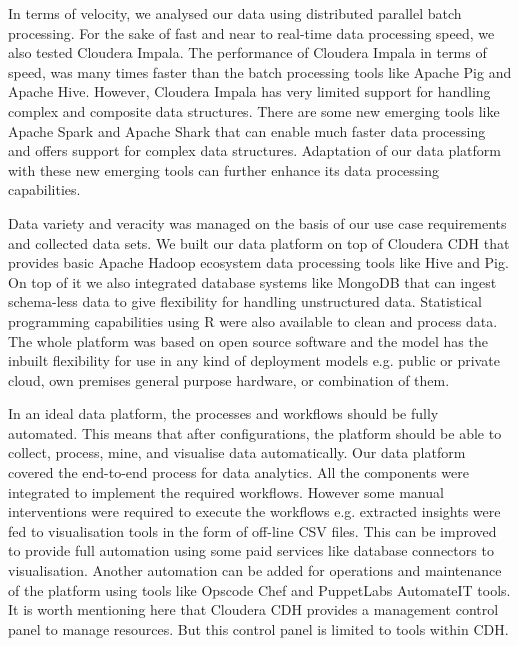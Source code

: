 In terms of velocity, we analysed our data using distributed parallel batch processing. For the sake of fast and near to real-time data processing speed, we also tested Cloudera Impala. The performance of Cloudera Impala in terms of speed, was many times faster than the batch processing tools like Apache Pig and Apache Hive.  However, Cloudera Impala has very limited support for handling complex and composite data structures. There are some new emerging tools like Apache Spark and Apache Shark that can enable much faster data processing and offers support for complex data structures. Adaptation of our data platform with these new emerging tools can further enhance its data processing capabilities. 

Data variety and veracity was managed on the basis of our use case requirements and collected data sets. We built our data platform on top of Cloudera CDH that provides basic Apache Hadoop ecosystem data processing tools like Hive and Pig. On top of it we also integrated database systems like MongoDB that can ingest schema-less data to give flexibility for handling unstructured data. Statistical programming capabilities using R were also available to clean and process data. The whole platform was based on open source software and the model has the inbuilt flexibility for use in any kind of deployment models e.g. public or private cloud, own premises general purpose hardware, or combination of them. 

In an ideal data platform, the processes and workflows should be fully automated. This means that after configurations, the platform should be able to collect, process, mine, and visualise data automatically. Our data platform covered the end-to-end process for data analytics. All the components were integrated to implement the required workflows. However some manual interventions were required to execute the workflows e.g. extracted insights were fed to visualisation tools in the form of off-line CSV files. This can be improved to provide full automation using some paid services like database connectors to visualisation. Another automation can be added for operations and maintenance of the platform using tools like Opscode Chef and PuppetLabs AutomateIT tools. It is worth mentioning here that Cloudera CDH provides a management control panel to manage resources. But this control panel is limited to tools within CDH. 
